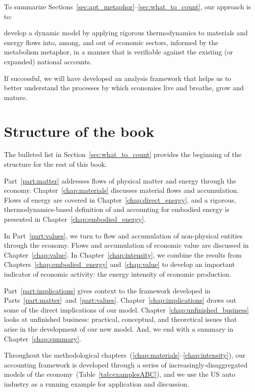 To summarize Sections~\ref{sec:apt_metaphor}--\ref{sec:what_to_count}, 
our approach is to:

\begin{svgraybox}
	develop a dynamic model 
	by applying rigorous thermodynamics 
	to materials and energy flows into, among, 
	and out of economic sectors,
	informed by the metabolism metaphor,
	in a manner that is verifiable against 
	the existing (or expanded) 
	national accounts.
\end{svgraybox}

\noindent{}If successful, we will have developed an analysis framework 
that helps us to better understand the processes 
by which economies live and breathe, grow and mature.


\section{Structure of the book}
\label{sec:structure}

The bulleted list in Section~\ref{sec:what_to_count} 
provides the beginning of the structure for the rest of this book.

Part~\ref{part:matter} addresses flows of physical matter and energy
through the economy.
Chapter~\ref{chap:materials} discusses material flows and accumulation.
Flows of energy are covered in Chapter~\ref{chap:direct_energy}, 
and a rigorous, thermodynamics-based definition of and accounting for 
embodied energy is presented in Chapter~\ref{chap:embodied_energy}.

In Part~\ref{part:values}, we turn to flow and accumulation of 
non-physical entities through the economy. 
Flows and accumulation of economic value are discussed in Chapter~\ref{chap:value}.
In Chapter~\ref{chap:intensity}, we combine the results from 
Chapters~\ref{chap:embodied_energy} and~\ref{chap:value} to
develop an important indicator of economic activity:
the energy intensity of economic production.

Part~\ref{part:implications} gives context to the framework developed in
Parts~\ref{part:matter}~and~\ref{part:values}.
Chapter~\ref{chap:implications} draws out some of the direct implications
of our model.
Chapter~\ref{chap:unfinished_business} looks at 
unfinished business: practical, conceptual, and theoretical issues
that arise in the development of our new model.
And, we end with a summary in Chapter~\ref{chap:summary}.

Throughout the methodological chapters~(\ref{chap:materials}--\ref{chap:intensity}),
our accounting framework is developed
through a series of increasingly-disaggregated
models of the economy~(Table~\ref{tab:examplesABC}),
and we use the US auto industry 
as a running example for application and discussion.

